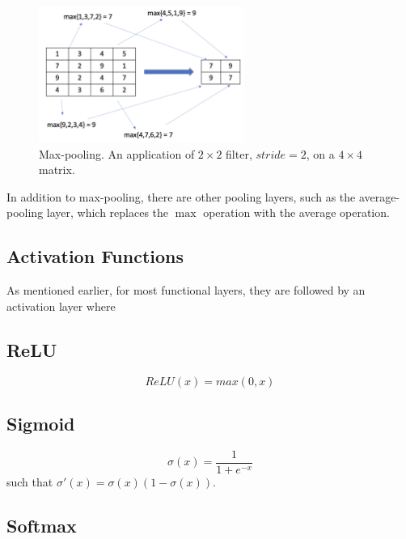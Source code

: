  
 
 \begin{figure}
    \centering
    \includegraphics[width=0.6\textwidth]{images/deepLearning/CNN/maxpooling.png}
    \caption{Max-pooling. An application of $2\times 2$ filter, $stride=2$, on a $4\times 4$ matrix.}
    \label{fig:maxpooling}
\end{figure}

In addition to max-pooling, there are other pooling layers, such as the average-pooling layer, which replaces the $\max$ operation with the average operation. 


\subsection{Activation Functions}

As mentioned earlier, for most functional layers, they are followed by an activation layer where 

\subsection*{ReLU}

\begin{equation}
    ReLU(x) = max(0,x)
\end{equation}

\subsection*{Sigmoid}

\begin{equation}
    \sigma(x) = \frac{1}{1+e^{-x}}
\end{equation}
such that $\sigma'(x)=\sigma(x)(1-\sigma(x))$. 

\subsection*{Softmax}

